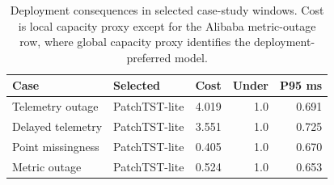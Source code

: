 \begin{table}[t]
\centering
\caption{Deployment consequences in selected case-study windows. Cost is local capacity proxy except for the Alibaba metric-outage row, where global capacity proxy identifies the deployment-preferred model.}
\label{tab:case-consequence}
\scriptsize
\begin{tabular}{l l r r r}
\toprule
Case & Selected & Cost & Under & P95 ms \\
\midrule
Telemetry outage & PatchTST-lite & 4.019 & 1.0 & 0.691 \\
Delayed telemetry & PatchTST-lite & 3.551 & 1.0 & 0.725 \\
Point missingness & PatchTST-lite & 0.405 & 1.0 & 0.670 \\
Metric outage & PatchTST-lite & 0.524 & 1.0 & 0.653 \\
\bottomrule
\end{tabular}
\end{table}
